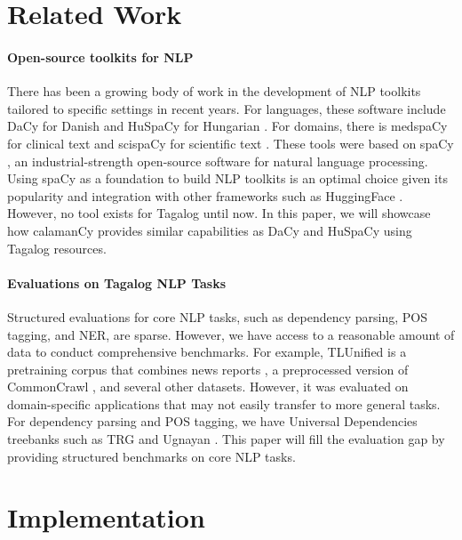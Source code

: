 \documentclass[11pt]{article}
\begin{document}



\section{Related Work}

\paragraph*{Open-source toolkits for NLP}
There has been a growing body of work in the development of NLP toolkits tailored to specific settings in recent years. 
For languages, these software include DaCy for Danish \citep{Enevoldsen2021DaCyAU} and HuSpaCy for Hungarian \citep{Orosz2022HuSpaCyAI}.
For domains, there is medspaCy for clinical text \citep{Eyre2021LaunchingIC} and scispaCy for scientific text \citep{Neumann2019ScispaCyFA}.
These tools were based on spaCy \citep{Honnibal2020Spacy}, an industrial-strength open-source software for natural language processing.
Using spaCy as a foundation to build NLP toolkits is an optimal choice given its popularity and integration with other frameworks such as HuggingFace \citep{Wolf2019HuggingFacesTS}.
However, no tool exists for Tagalog until now.
In this paper, we will showcase how calamanCy provides similar capabilities as DaCy and HuSpaCy using Tagalog resources.

\paragraph*{Evaluations on Tagalog NLP Tasks} 
Structured evaluations for core NLP tasks, such as dependency parsing, POS tagging, and NER, are sparse.
However, we have access to a reasonable amount of data to conduct comprehensive benchmarks.
For example, TLUnified \citep{Cruz2021ImprovingLL} is a pretraining corpus that combines news reports \citep{Cruz2020ExploitingNA}, a preprocessed version of CommonCrawl \citep{OrtizSuarez2019AsynchronousPF}, and several other datasets.
However, it was evaluated on domain-specific applications that may not easily transfer to more general tasks.
For dependency parsing and POS tagging, we have Universal Dependencies treebanks such as TRG \citep{Dehouck2019PhylogenicMD,Kondratyuk201975L1} and Ugnayan \citep{Aquino2020ParsingIT}.
This paper will fill the evaluation gap by providing structured benchmarks on core NLP tasks.

\section{Implementation}
\end{document}
